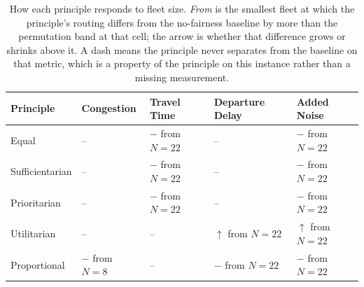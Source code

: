 \begin{table}[t]
\centering
\caption{How each principle responds to fleet size. \emph{From} is the smallest fleet at which the principle's routing differs from the no-fairness baseline by more than the permutation band at that cell; the arrow is whether that difference grows or shrinks above it. A dash means the principle never separates from the baseline on that metric, which is a property of the principle on this instance rather than a missing measurement.}
\label{tab:response}
\begin{tabular}{lllll}
\toprule
Principle & Congestion & Travel Time & Departure Delay & Added Noise \\
\midrule
Equal & -- & $-$ from $N{=}22$ & -- & $-$ from $N{=}22$ \\
Sufficientarian & -- & $-$ from $N{=}22$ & -- & $-$ from $N{=}22$ \\
Prioritarian & -- & $-$ from $N{=}22$ & -- & $-$ from $N{=}22$ \\
Utilitarian & -- & -- & $\uparrow$ from $N{=}22$ & $\uparrow$ from $N{=}22$ \\
Proportional & $-$ from $N{=}8$ & -- & $-$ from $N{=}22$ & $-$ from $N{=}22$ \\
\bottomrule
\end{tabular}
\end{table}
